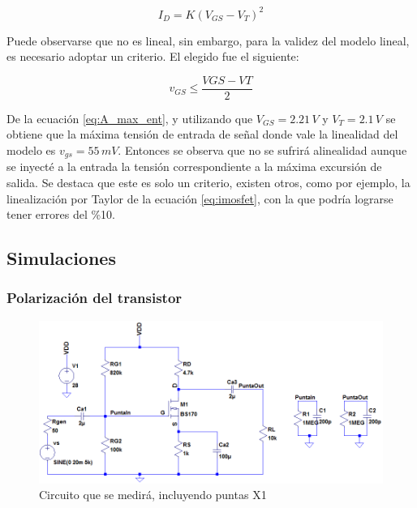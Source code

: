 \documentclass[10pt,spanish,a4paper,notitlepage]{article}
\begin{document}
\begin{equation}
    I_{D}=K\left (V_{GS}-V_{T}\right )^{2}
    \label{eq:imosfet}
\end{equation}

Puede observarse que no es lineal, sin embargo, para la validez del modelo lineal, es necesario adoptar un criterio. El elegido fue el siguiente:

\begin{equation}
    v_{GS} \leqslant \frac{VGS-VT}{2}
    \label{eq:A_max_ent}
\end{equation}

De la ecuación \ref{eq:A_max_ent}, y utilizando que $V_{GS}=2.21\,\unit{V}$ y $V_T=2.1\,\unit{V}$ se obtiene que la máxima tensión de entrada de señal donde vale la linealidad del modelo es $v_{gs}=55\,\unit{mV}$. Entonces se observa que no se sufrirá alinealidad aunque se inyecté a la entrada la tensión correspondiente a la máxima excursión de salida. Se destaca que este es solo un criterio, existen otros, como por ejemplo, la linealización por Taylor de la ecuación \ref{eq:imosfet}, con la que podría lograrse tener errores del \%10.


\subsection{Simulaciones}

\subsubsection{Polarización del transistor}

\begin{figure}[H]
\centering
\includegraphics[scale=0.7]{circuitos/A_circuito_simu.png}
\caption{Circuito que se medirá, incluyendo puntas X1}
\label{fig:A_circuito_simu}
\end{figure}
\end{document}
